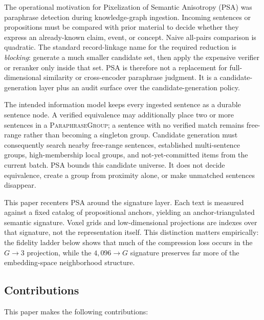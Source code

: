 \documentclass[11pt]{article}
\begin{document}
The operational motivation for Pixelization of Semantic Anisotropy (PSA) was paraphrase detection during knowledge-graph ingestion. Incoming sentences or propositions must be compared with prior material to decide whether they express an already-known claim, event, or concept. Naive all-pairs comparison is quadratic. The standard record-linkage name for the required reduction is \emph{blocking}: generate a much smaller candidate set, then apply the expensive verifier or reranker only inside that set. PSA is therefore not a replacement for full-dimensional similarity or cross-encoder paraphrase judgment. It is a candidate-generation layer plus an audit surface over the candidate-generation policy.

The intended information model keeps every ingested sentence as a durable sentence node. A verified equivalence may additionally place two or more sentences in a \textsc{ParaphraseGroup}; a sentence with no verified match remains free-range rather than becoming a singleton group. Candidate generation must consequently search nearby free-range sentences, established multi-sentence groups, high-membership local groups, and not-yet-committed items from the current batch. PSA bounds this candidate universe. It does not decide equivalence, create a group from proximity alone, or make unmatched sentences disappear.

This paper recenters PSA around the signature layer. Each text is measured against a fixed catalog of propositional anchors, yielding an anchor-triangulated semantic signature. Voxel grids and low-dimensional projections are indexes over that signature, not the representation itself. This distinction matters empirically: the fidelity ladder below shows that much of the compression loss occurs in the $G\rightarrow3$ projection, while the $4{,}096\rightarrow G$ signature preserves far more of the embedding-space neighborhood structure.

\subsection{Contributions}

This paper makes the following contributions:
\end{document}
